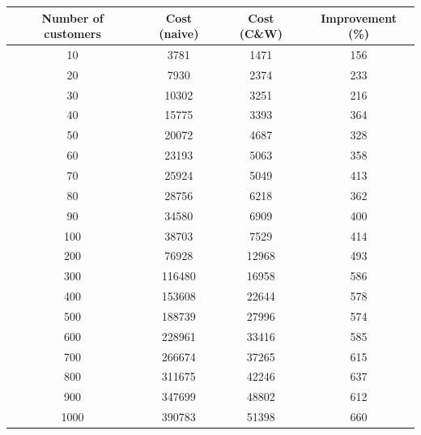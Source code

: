 \documentclass[a4paper]{article}
\begin{document}
        \begin{minipage}{\textwidth}
            \centering
            \begin{tabular}{ c c c c }
                Number of customers & Cost (naive) & Cost (C\&W) & Improvement (\%) \\
                \hline
                \hline
                10                  &   3781       &  1471       & 156 \\
                20                  &   7930       &  2374       & 233 \\
                30                  &  10302       &  3251       & 216 \\
                40                  &  15775       &  3393       & 364 \\
                50                  &  20072       &  4687       & 328 \\
                60                  &  23193       &  5063       & 358 \\
                70                  &  25924       &  5049       & 413 \\
                80                  &  28756       &  6218       & 362 \\
                90                  &  34580       &  6909       & 400 \\
                100                 &  38703       &  7529       & 414 \\
                200                 &  76928       & 12968       & 493 \\
                300                 & 116480       & 16958       & 586 \\
                400                 & 153608       & 22644       & 578 \\
                500                 & 188739       & 27996       & 574 \\
                600                 & 228961       & 33416       & 585 \\
                700                 & 266674       & 37265       & 615 \\
                800                 & 311675       & 42246       & 637 \\
                900                 & 347699       & 48802       & 612 \\
                1000                & 390783       & 51398       & 660 \\
                \hline
            \end{tabular}
        \end{minipage}
\end{document}
